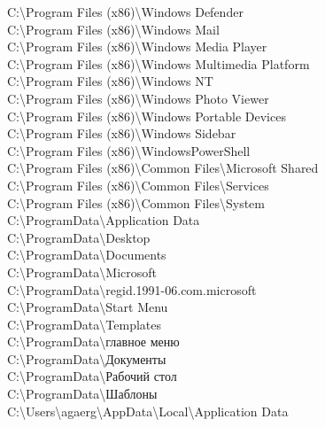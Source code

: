 C:\textbackslash Program Files (x86)\textbackslash Windows Defender \\
C:\textbackslash Program Files (x86)\textbackslash Windows Mail \\
C:\textbackslash Program Files (x86)\textbackslash Windows Media Player \\
C:\textbackslash Program Files (x86)\textbackslash Windows Multimedia Platform \\
C:\textbackslash Program Files (x86)\textbackslash Windows NT \\
C:\textbackslash Program Files (x86)\textbackslash Windows Photo Viewer \\
C:\textbackslash Program Files (x86)\textbackslash Windows Portable Devices \\
C:\textbackslash Program Files (x86)\textbackslash Windows Sidebar \\
C:\textbackslash Program Files (x86)\textbackslash WindowsPowerShell \\
C:\textbackslash Program Files (x86)\textbackslash Common Files\textbackslash Microsoft Shared \\
C:\textbackslash Program Files (x86)\textbackslash Common Files\textbackslash Services \\
C:\textbackslash Program Files (x86)\textbackslash Common Files\textbackslash System \\
C:\textbackslash ProgramData\textbackslash Application Data \\
C:\textbackslash ProgramData\textbackslash Desktop \\
C:\textbackslash ProgramData\textbackslash Documents \\
C:\textbackslash ProgramData\textbackslash Microsoft \\
C:\textbackslash ProgramData\textbackslash regid.1991-06.com.microsoft \\
C:\textbackslash ProgramData\textbackslash Start Menu \\
C:\textbackslash ProgramData\textbackslash Templates \\
C:\textbackslash ProgramData\textbackslash главное меню \\
C:\textbackslash ProgramData\textbackslash Документы \\
C:\textbackslash ProgramData\textbackslash Рабочий стол \\
C:\textbackslash ProgramData\textbackslash Шаблоны \\
C:\textbackslash Users\textbackslash agaerg\textbackslash AppData\textbackslash Local\textbackslash Application Data \\
